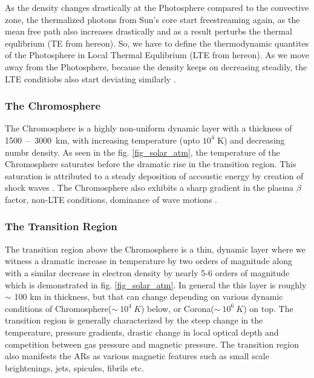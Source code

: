 As the density changes drastically at the Photosphere compared to the convective zone, the thermalized photons from Sun's core start freestreaming again, as the mean free path also increases drastically and as a result perturbs the thermal equlibrium (TE from hereon). So, we have to define the thermodynamic quantites of the Photosphere in Local Thermal Equlibrium (LTE from hereon). As we move away from the Photosphere, because the density keeps on decreasing steadily, the LTE conditiobs also start deviating similarly .

\subsubsection{The Chromosphere}\label{chromosphere}

The Chromosphere is a highly non-uniform dynamic layer with a thickness of 1500~--~3000~km, with increasing temperature (upto $10^{4}$ K) and decreasing numbr density. As seen in the fig. \ref{fig_solar_atm}, the temperature of the Chromosphere saturates before the dramatic rise in the transition region. This saturation is attributed to a steady deposition of accoustic energy by creation of shock waves . The Chromosphere also exhibits a sharp gradient in the plasma $\beta$ factor, non-LTE conditions, dominance of wave motions . 

\subsubsection{The Transition Region}\label{transition-region}

The transition region above the Chromosphere is a thin, dynamic layer where we witness a dramatic increase in temperature by two orders of magnitude along with a similar decrease in electron density by nearly 5-6 orders of magnitude which is demonstrated in fig. \ref{fig_solar_atm}. In general the this layer is roughly $\sim$ 100 km in thickness, but that can change depending on various dynamic conditions of Chromosphere($\sim~10^{4}~K$) below, or Corona($\sim~10^{6}~K$) on top. The transition region is generally characterized by the steep change in the temperature, pressure gradients, drastic change in local optical depth and competition between gas pressure and magnetic pressure. The transition region also manifests the ARs as various magnetic features such as small scale brightenings, jets, spicules, fibrils etc. 

